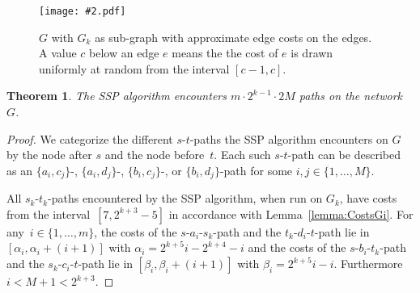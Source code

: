 \documentclass[11pt]{article}
\newtheorem{theorem}{Theorem}
\newcommand{\GFX}[2][]{\texttt{[image: \#2.pdf]}}
\newenvironment{fig}
{\begin{figure}[th]\begin{center}}
{\end{center}\end{figure}}
\begin{document}
\begin{fig}
  \GFX[width=0.95\textwidth]{Iteration2}
  \caption{$G$ with $G_k$ as sub-graph with approximate edge costs on the edges. A value $c$ below an edge $e$ means the the cost of $e$ is drawn uniformly at random from the interval $[c-1,c]$.}
  \label{fig:step III}
\end{fig}

\begin{theorem}
The SSP algorithm encounters $m \cdot 2^{k-1} \cdot 2M$ paths on the network~$G$.
\end{theorem}

\begin{proof}
We categorize the different $s$-$t$-paths the SSP algorithm encounters on $G$ by the node after $s$ and the node before~$t$.
Each such $s$-$t$-path can be described as an $\{a_i,c_j\}$-, $\{a_i,d_j\}$-, $\{b_i,c_j\}$-, or $\{b_i,d_j\}$-path for some $i,j \in \{1,\dots,M\}$.

All $s_k$-$t_k$-paths encountered by the SSP algorithm, when run on $G_k$, have costs from the interval~$[7, 2^{k+3}-5]$ in accordance with Lemma~\ref{lemma:CostsGi}.
For any~$i\in\{1,\ldots,m\}$, the costs of the $s$-$a_i$-$s_k$-path and the $t_k$-$d_i$-$t$-path lie
in $[\alpha_i,\alpha_i+(i+1)]$ with $\alpha_i = 2^{k+5}i - 2^{k+4} - i$ and the costs of the $s$-$b_i$-$t_k$-path and the
$s_k$-$c_i$-$t$-path lie in $[\beta_i,\beta_i+(i+1)]$ with $\beta_i = 2^{k+5}i-i$.
Furthermore $i<M+1< 2^{k+3}$.


\end{proof}
\end{document}
